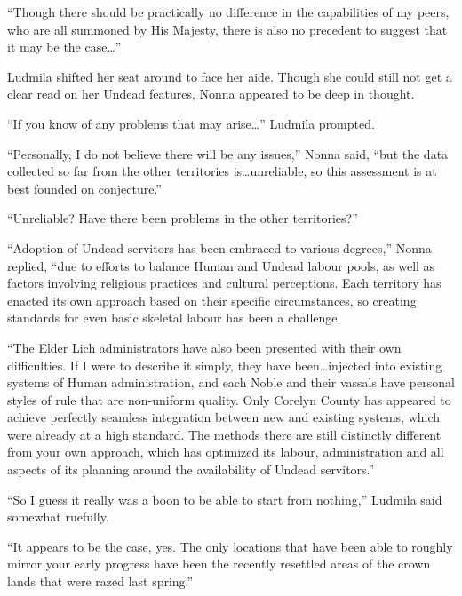  

“Though there should be practically no difference in the capabilities of my peers, who are all summoned by His Majesty, there is also no precedent to suggest that it may be the case…”

 

Ludmila shifted her seat around to face her aide. Though she could still not get a clear read on her Undead features, Nonna appeared to be deep in thought.

 

“If you know of any problems that may arise…” Ludmila prompted.

 

“Personally, I do not believe there will be any issues,” Nonna said, “but the data collected so far from the other territories is…unreliable, so this assessment is at best founded on conjecture.”

 

“Unreliable? Have there been problems in the other territories?”

 

“Adoption of Undead servitors has been embraced to various degrees,” Nonna replied, “due to efforts to balance Human and Undead labour pools, as well as factors involving religious practices and cultural perceptions. Each territory has enacted its own approach based on their specific circumstances, so creating standards for even basic skeletal labour has been a challenge.

 

“The Elder Lich administrators have also been presented with their own difficulties. If I were to describe it simply, they have been…injected into existing systems of Human administration, and each Noble and their vassals have personal styles of rule that are non-uniform quality. Only Corelyn County has appeared to achieve perfectly seamless integration between new and existing systems, which were already at a high standard. The methods there are still distinctly different from your own approach, which has optimized its labour, administration and all aspects of its planning around the availability of Undead servitors.”

 

“So I guess it really was a boon to be able to start from nothing,” Ludmila said somewhat ruefully.

 

“It appears to be the case, yes. The only locations that have been able to roughly mirror your early progress have been the recently resettled areas of the crown lands that were razed last spring.”

